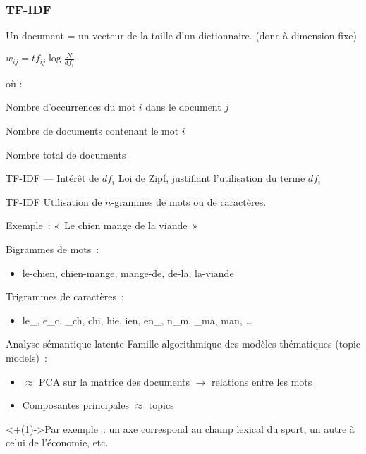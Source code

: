\begin{frame}
  \frametitle{TF-IDF}
  Un document = un vecteur de la taille d'un dictionnaire. (donc à dimension fixe) \\
  \begin{center}
    $\boxed{w_{ij} = tf_{ij}\log{\frac{N}{df_i}}}$
  \end{center}
  où :

  \begin{description}[<+->]
    \item[$tf_{ij}$] Nombre d'occurrences du mot $i$ dans le document $j$
    \item[$df_i$] Nombre de documents contenant le mot $i$
    \item[$N$] Nombre total de documents
  \end{description}
\end{frame}

\begin{frame}{TF-IDF --- Intérêt de $df_i$}
  Loi de Zipf, justifiant l'utilisation du terme $df_i$
\end{frame}

\begin{frame}{TF-IDF}
  Utilisation de $n$-grammes de mots ou de caractères.
  \begin{center}
  Exemple~: «~Le chien mange de la viande~»
  \end{center}

  Bigrammes de mots~:

  \begin{itemize}
  \item le-chien, chien-mange, mange-de, de-la, la-viande
  \end{itemize}

  Trigrammes de caractères~:

  \begin{itemize}
  \item le\_, e\_c, \_ch, chi, hie, ien, en\_, n\_m, \_ma, man, …
  \end{itemize}
\end{frame}

\begin{frame}{Analyse sémantique latente}
  Famille algorithmique des modèles thématiques (topic models)~:

  \begin{itemize}[<+(1)->]
    \item $\approx$ PCA sur la matrice des documents $\rightarrow$ relations entre les mots
    \item Composantes principales $\approx$ topics
  \end{itemize}

  \onslide<+(1)->{Par exemple~: un axe correspond au champ lexical du sport, un autre à celui de l'économie, etc.}
\end{frame}


